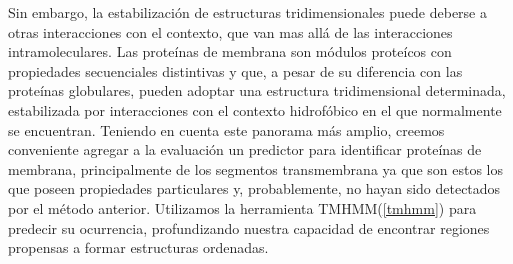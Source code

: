 Sin embargo, la estabilización de estructuras tridimensionales puede deberse a otras interacciones con el contexto, que van mas allá de las interacciones intramoleculares.
Las proteínas de membrana son módulos proteícos con propiedades secuenciales distintivas y que, a pesar de su diferencia con las proteínas globulares, 
pueden adoptar una estructura tridimensional determinada, estabilizada por interacciones con el contexto hidrofóbico en el que normalmente se encuentran.
Teniendo en cuenta este panorama más amplio, creemos conveniente agregar a la evaluación un predictor para identificar proteínas de membrana,
principalmente de los segmentos transmembrana ya que son estos los que poseen propiedades particulares y, probablemente, no hayan sido detectados por el método anterior.
Utilizamos la herramienta TMHMM(\ref{tmhmm}) para predecir su ocurrencia, profundizando nuestra capacidad de encontrar regiones propensas a formar estructuras ordenadas.







